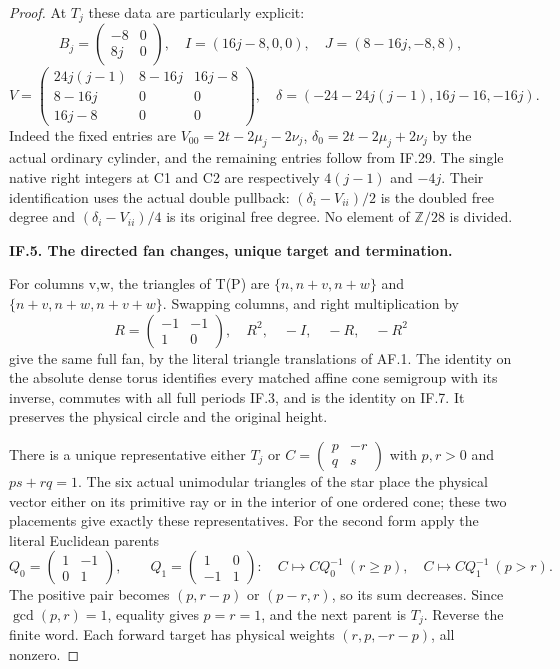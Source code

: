 \begin{proof}
At \(T_j\) these data are particularly explicit:
\[
 B_j=\begin{pmatrix}-8&0\\8j&0\end{pmatrix},\quad
 I=(16j-8,0,0),\quad J=(8-16j,-8,8),
 \tag{IF.30}
\]
\[
 V=\begin{pmatrix}
 24j(j-1)&8-16j&16j-8\\
 8-16j&0&0\\16j-8&0&0
 \end{pmatrix},\quad
 \delta=(-24-24j(j-1),16j-16,-16j).
 \tag{IF.31}
\]
Indeed the fixed entries are
\(V_{00}=2t-2\mu_j-2\nu_j\),
\(\delta_0=2t-2\mu_j+2\nu_j\) by the actual ordinary cylinder,
and the remaining entries follow from IF.29.  The single native
right integers at C1 and C2 are respectively
\(4(j-1)\) and \(-4j\).  Their identification uses the actual
double pullback: \((\delta_i-V_{ii})/2\) is the doubled free
degree and \((\delta_i-V_{ii})/4\) is its original free degree.
No element of \(\mathbb Z/28\) is divided.

\par\medskip\noindent\textbf{IF.5. The directed fan changes, unique target and termination.}\par\nopagebreak[4]

For columns v,w, the triangles of T(P) are
\(\{n,n+v,n+w\}\) and
\(\{n+v,n+w,n+v+w\}\).  Swapping columns, and right
multiplication by
\[
 R=\begin{pmatrix}-1&-1\\1&0\end{pmatrix},\quad
 R^2,\quad -I,\quad -R,\quad -R^2
 \tag{IF.32}
\]
give the same full fan, by the literal triangle translations of
AF.1.  The identity on the absolute dense torus identifies every
matched affine cone semigroup with its inverse, commutes with all
full periods IF.3, and is the identity on IF.7.  It preserves the
physical circle and the original height.

There is a unique representative either \(T_j\) or
\(C=\left(\begin{smallmatrix}p&-r\\q&s\end{smallmatrix}\right)\)
with \(p,r>0\) and \(ps+rq=1\).  The six actual unimodular triangles of the
star place the physical vector either on its primitive ray or in the
interior of one ordered cone; these two placements give exactly
these representatives.  For the second form apply the literal
Euclidean parents
\[
 Q_0=\begin{pmatrix}1&-1\\0&1\end{pmatrix},\qquad
 Q_1=\begin{pmatrix}1&0\\-1&1\end{pmatrix}:\quad
 C\mapsto CQ_0^{-1}\ (r\ge p),\quad
 C\mapsto CQ_1^{-1}\ (p>r).
 \tag{IF.33}
\]
The positive pair becomes \((p,r-p)\) or \((p-r,r)\), so its sum decreases.
Since \(\gcd(p,r)=1\), equality gives \(p=r=1\), and the next parent is \(T_j\).
Reverse the finite word.  Each forward target has physical weights
\((r,p,-r-p)\), all nonzero.


\end{proof}

